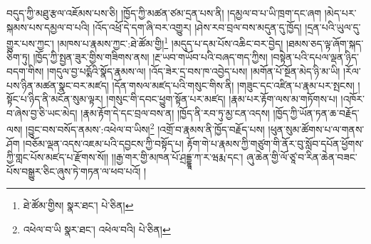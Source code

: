 བདུད་ཀྱི་མཐུ་རྩལ་འཇོམས་པས་ཅི། །ཁྱོད་ཀྱི་མཚན་ཙམ་དྲན་པས་ནི། །དམྱལ་བ་པ་ཡི་ཁྲག་དང་ཞག །མེད་པར་སྐམས་པས་དམྱལ་བ་པའི། །འོད་འཕྲོ་དེ་དག་ཞི་བར་འགྱུར། །ཤེས་རབ་བྲལ་བས་མདུན་དུ་ཁྱོད། །དྲན་པའི་ཡུལ་དུ་གྱུར་པས་ཀྱང་། །མཁས་པ་རྣམས་ཀྱང་:ཐེ་ཚོམ་གྱི།\footnote{ཐེ་ཚོམ་གྱིས།  སྣར་ཐང་།  པེ་ཅིན། } །མདུད་པ་དམ་པོས་འཆིང་བར་བྱེད། །ཐམས་ཅད་ལྟ་ཞོག་སྐད་ཅིག་ཏུ། །ཁྱོད་ཀྱི་སྤྱན་ཟུར་གྱིས་གཟིགས་ནས། །རྔ་ཡབ་གཡོབ་པའི་བཞད་གད་ཀྱིས། །བསྟེན་པའི་དཔལ་ལྡན་ཉིད་བདག་གིས། །གདུལ་བྱ་པདྨོའི་སྣོད་རྣམས་ལ། །འོད་ཟེར་དྲ་བས་ཁ་འབྱེད་པས། །མགོན་པོ་སྔོན་མེད་ཉི་མ་ཡི། །རོལ་པས་ཉིན་མཚན་སྣང་བར་མཛད། །དོན་གསལ་མཛད་པའི་གསུང་གིས་ནི། །གཟུང་དང་འཛིན་པ་རྣམ་པར་སྤངས། །སྟོང་པ་ཉིད་ནི་མངོན་སུམ་ལྟར། །གསུང་གི་དབང་ཕྱུག་སྟོན་པར་མཛད། །རྣམ་པར་རྟོག་ལས་མ་གཏོགས་པ། །འཁོར་བ་ཞེས་བྱ་ཅི་ཡང་མེད། །རྣམ་རྟོག་དེ་དང་བྲལ་བས་ན། །ཁྱོད་ནི་རབ་ཏུ་མྱ་ངན་འདས། །ཁྱོད་ཀྱི་ཡོན་ཏན་ཆ་བརྗོད་ལས། །བྱུང་བས་བསོད་ནམས་:འཕེལ་བ་ཡིས།\footnote{འཕེལ་བ་ཡི  སྣར་ཐང་། འཕེལ་བའི།  པེ་ཅིན། } །འགྲོ་བ་རྣམས་ནི་ཁྱོད་བརྗོད་པས། །ཕུན་སུམ་ཚོགས་པ་ལ་གནས་ཤོག །བཅོམ་ལྡན་འདས་འཇམ་པའི་དབྱངས་ཀྱི་བསྟོད་པ། རྟོག་གེ་པ་རྣམས་ཀྱི་གཙུག་གི་ནོར་བུ་སློབ་དཔོན་ཕྱོགས་ཀྱི་གླང་པོས་མཛད་པ་རྫོགས་སོ།། །།རྒྱ་གར་གྱི་མཁན་པོ་ཤྲདྡྷཱ་ཀ་ར་ཝརྨ་དང་། ཞུ་ཆེན་གྱི་ལོ་ཙཱ་བ་རིན་ཆེན་བཟང་པོས་བསྒྱུར་ཅིང་ཞུས་ཏེ་གཏན་ལ་ཕབ་པའོ། ། 